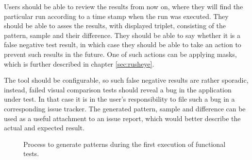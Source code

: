 \documentclass[11pt,oneside,final]{fithesis2}
\begin{document}
  Users should be able to review the results from now on, where they will find the particular run according to a time stamp when the run was executed. They should be able to asses the results,
  with displayed triplet, consisting of the pattern, sample and their difference. They should be able to say whether it is a false negative test result, in which case they should be able to 
  take an action to prevent such results in the future. One of such actions can be applying masks, which is further described in chapter \ref{sec:rusheye}.
  
  The tool should be configurable, so such false negative results are rather sporadic, instead, failed visual comparison tests should reveal a bug in the application under test. In that case
  it is in the user's responsibility to file such a bug in a corresponding issue tracker. The generated pattern, sample and difference can be used as a useful attachment to an issue report, which
  would better describe the actual and expected result.
  
   \begin{figure}[!htb]
    \begin{center}
    \leavevmode
    \centerline{}
    \end{center}
    \caption{Process to generate patterns during the first execution of functional tests.}
    \label{fig:FirstTestsRunBMPN}
  \end{figure}
  
\end{document}
